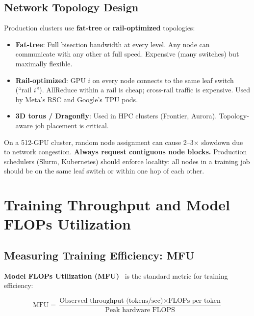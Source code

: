 \subsection{Network Topology Design}
\label{network-topology-design}

Production clusters use \textbf{fat-tree} or \textbf{rail-optimized} topologies:

\begin{itemize}
  \item \textbf{Fat-tree}: Full bisection bandwidth at every level. Any node can communicate with any other at full speed. Expensive (many switches) but maximally flexible.
  \item \textbf{Rail-optimized}: GPU $i$ on every node connects to the same leaf switch (``rail $i$''). AllReduce within a rail is cheap; cross-rail traffic is expensive. Used by Meta’s RSC and Google’s TPU pods.
  \item \textbf{3D torus / Dragonfly}: Used in HPC clusters (Frontier, Aurora). Topology-aware job placement is critical.
\end{itemize}

\begin{warningbox}
On a 512-GPU cluster, random node assignment can cause 2--3$\times$ slowdown due to network congestion. \textbf{Always request contiguous node blocks.} Production schedulers (Slurm, Kubernetes) should enforce locality: all nodes in a training job should be on the same leaf switch or within one hop of each other.
\end{warningbox}

\section{Training Throughput and Model FLOPs Utilization}
\label{sec:mfu}

\subsection{Measuring Training Efficiency: MFU}
\label{measuring-training-efficiency-mfu}

\textbf{Model FLOPs Utilization (MFU)}~\cite{chowdhery2022palm} is the standard metric for training efficiency:

\begin{equation}
\text{MFU} = \frac{\text{Observed throughput (tokens/sec)} \times \text{FLOPs per token}}{\text{Peak hardware FLOPS}}
\end{equation}


